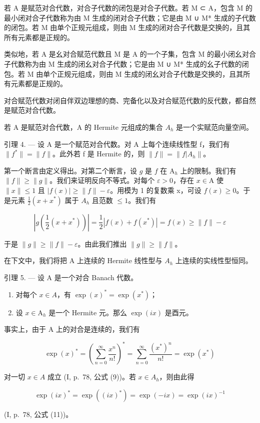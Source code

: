若 A 是赋范对合代数，对合子代数的闭包是对合子代数。若 M ⊂ A，包含 M 的最小闭对合子代数称为由 M 生成的闭对合子代数；它是由 M ∪ M* 生成的子代数的闭包。若 M 由单个正规元组成，则由 M 生成的闭对合子代数是交换的，且其所有元素都是正规的。

类似地，若 A 是幺对合赋范代数且 M 是 A 的一个子集，包含 M 的最小闭幺对合子代数称为由 M 生成的闭幺对合子代数；它是由 M ∪ M* 生成的幺子代数的闭包。若 M 由单个正规元组成，则由 M 生成的闭幺对合子代数是交换的，且其所有元素都是正规的。

对合赋范代数对闭自伴双边理想的商、完备化以及对合赋范代数的反代数，都自然是赋范对合代数。

若 A 是赋范对合代数，A 的 Hermite 元组成的集合 \(A_{h}\) 是一个实赋范向量空间。

引理 4. --- 设 A 是一个赋范对合代数。对 A 上每个连续线性型 f，我们有 \(\|f^{*}\|=\|f\|\)。此外若 f 是 Hermite 的，则 \(\|f\|=\|f|A_{h}\|\)。

第一个断言由定义得出。对第二个断言，设 \(g\) 是 \(f\) 在 \(\mathrm{A}_h\) 上的限制。我们有 \(\| f \| \geqslant \| g \|\)。我们来证明反向不等式。对每个 \(\varepsilon > 0\)，存在 \(x \in \mathrm{A}\) 使 \(\| x \| \leqslant 1\) 且 \(|f(x)| \geqslant \|f\| - \varepsilon\)。用模为 1 的复数乘 x，可设 \(f(x) \geqslant 0\)。于是元素 \(\frac{1}{2}(x + x^{*})\) 属于 \(A_{h}\) 且范数 \(\leqslant 1\)。我们有

\[
\left| g \left(\frac {1}{2} (x + x ^ {*})\right) \right| = \frac {1}{2} | f (x) + f (x ^ {*}) | = f (x) \geqslant \| f \| - \varepsilon
\]

于是 \(\|g\|\geqslant\|f\|-\varepsilon\)。由此我们推出 \(\|g\|\geqslant\|f\|\)。

在下文中，我们将把 A 上连续的 Hermite 线性型与 \(A_{h}\) 上连续的实线性型恒同。

引理 5. --- 设 A 是一个对合 Banach 代数。

\begin{enumerate}
\def\labelenumi{\alph{enumi})}
\item
  对每个 \(x \in A\)，有 \(\exp(x)^{*} = \exp(x^{*})\)；
\item
  设 \(x \in \mathrm{A}_h\) 是一个 Hermite 元。那么 \(\exp(ix)\) 是酉元。
\end{enumerate}

事实上，由于 A 上的对合是连续的，我们有

\[
\exp (x) ^ {*} = \left(\sum_ {n = 0} ^ {\infty} \frac {x ^ {n}}{n !}\right) ^ {*} = \sum_ {n = 0} ^ {\infty} \frac {(x ^ {*}) ^ {n}}{n !} = \exp (x ^ {*})
\]

对一切 \(x \in A\) 成立 (I, p.~78, 公式 (9))。若 \(x \in A_{h}\)，则由此得

\[
\exp (i x) ^ {*} = \exp ((i x) ^ {*}) = \exp (- i x) = \exp (i x) ^ {- 1}
\]

(I, p.~78, 公式 (11))。

